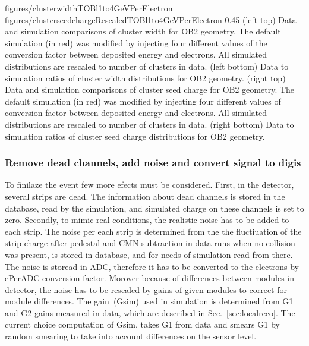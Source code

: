                  {figures/clusterwidthTOBl1to4GeVPerElectron}
                 {figures/clusterseedchargeRescaledTOBl1to4GeVPerElectron} %
                 {0.45}       %
                 {(left top) Data and simulation  comparisons of cluster width for OB2 geometry. The default simulation (in red) was modified by injecting four different values of the conversion factor between deposited energy and electrons. All simulated distributions are rescaled to number of clusters in data. (left bottom) Data to simulation ratios of cluster width distributions for OB2 geometry. (right top) Data and simulation  comparisons of cluster seed charge for OB2 geometry. The default simulation (in red) was modified by injecting four different values of conversion factor between deposited energy and electrons. All simulated distributions are rescaled to number of clusters in data. (right bottom) Data to simulation ratios of cluster seed charge distributions for OB2 geometry. }


\subsubsection{Remove dead channels, add noise and convert signal to digis}

To finilaze the event few more efects must be considered. First, in the detector, several strips are dead. The information about dead channels is stored in the database, read by the simulation, and simulated charge on these channels is set to zero. Secondly, to mimic real conditions, the realistic noise has to be added to each strip. The noise per each strip is determined from the the fluctiuation of the strip charge after pedestal and CMN subtraction in data runs when no collision was present, is stored in database, and for needs of simulation read from there. The noise is storead in ADC, therefore it has to be converted to the electrons by ePerADC conversion factor. Morover because of differences between modules in detector, the noise has to be rescaled by gains of given modules to correct for module differences. The gain~(Gsim) used in simulation is determined from G1 and G2 gains measured in data, which are described in Sec.~\ref{sec:localreco}. The current choice computation of Gsim, takes G1 from data and smears G1 by random smearing to take into account differences on the sensor level.


